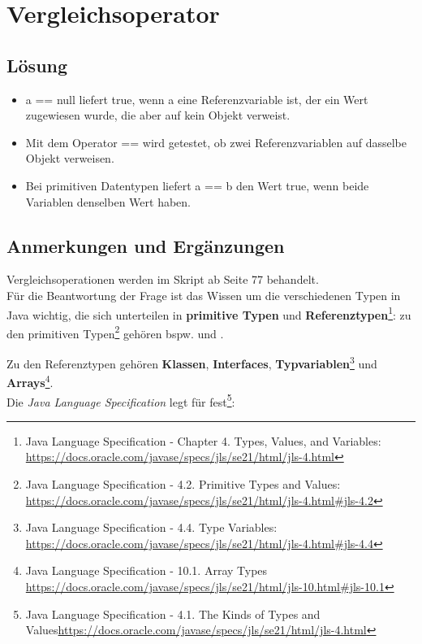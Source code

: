 \chapter{Vergleichsoperator}

\section*{Lösung}

\begin{itemize}
    \item a == null liefert true, wenn a eine Referenzvariable ist, der ein Wert zugewiesen wurde, die aber auf kein Objekt verweist.
    \item Mit dem Operator == wird getestet, ob zwei Referenzvariablen auf dasselbe Objekt verweisen.
    \item Bei primitiven Datentypen liefert a == b den Wert true, wenn beide Variablen denselben Wert haben.
\end{itemize}


\section*{Anmerkungen und Ergänzungen}

Vergleichsoperationen werden im Skript ab Seite 77 behandelt.\\

Für die Beantwortung der Frage ist das Wissen um die verschiedenen Typen in Java wichtig, die sich unterteilen in
\textbf{primitive Typen} und \textbf{Referenztypen}\footnote{
    Java Language Specification - Chapter 4. Types, Values, and Variables: \url{https://docs.oracle.com/javase/specs/jls/se21/html/jls-4.html}
}: zu den primitiven Typen\footnote{
    Java Language Specification - 4.2. Primitive Types and Values: \url{https://docs.oracle.com/javase/specs/jls/se21/html/jls-4.html#jls-4.2}
} gehören bspw.  und .

Zu den Referenztypen gehören \textbf{Klassen}, \textbf{Interfaces}, \textbf{Typvariablen}\footnote{
    Java Language Specification - 4.4. Type Variables: \url{https://docs.oracle.com/javase/specs/jls/se21/html/jls-4.html#jls-4.4}
}
und \textbf{Arrays}\footnote{
    Java Language Specification - 10.1. Array Types \url{https://docs.oracle.com/javase/specs/jls/se21/html/jls-10.html#jls-10.1}
}.\\

Die \textit{Java Language Specification} legt für  fest\footnote{Java Language Specification - 4.1. The Kinds of Types and Values\url{https://docs.oracle.com/javase/specs/jls/se21/html/jls-4.html}}:

